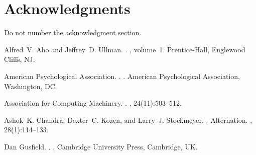 \documentclass[11pt,letterpaper]{article}
\begin{document}

\section*{Acknowledgments}

Do not number the acknowledgment section.

\begin{thebibliography}{}

Alfred~V. Aho and Jeffrey~D. Ullman.
.
, volume~1.
\newblock Prentice-{Hall}, Englewood Cliffs, NJ.

{American Psychological Association}.
.
.
\newblock American Psychological Association, Washington, DC.

{Association for Computing Machinery}.
.
, 24(11):503--512.

Ashok~K. Chandra, Dexter~C. Kozen, and Larry~J. Stockmeyer.
.
\newblock Alternation.
,
  28(1):114--133.

Dan Gusfield.
.
.
\newblock Cambridge University Press, Cambridge, UK.

\end{thebibliography}
\end{document}

